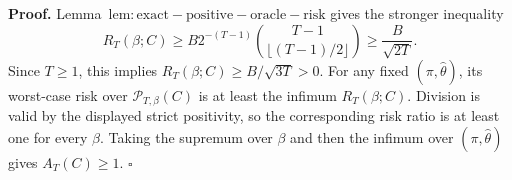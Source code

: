 \textbf{Proof.} Lemma~\(\mathrm{lem:exact-positive-oracle-risk}\) gives the stronger inequality
\[
R_T(\beta;C)\ge B2^{-(T-1)}\binom{T-1}{\lfloor(T-1)/2\rfloor}\ge \frac{B}{\sqrt{2T}}.
\]
Since \(T\ge1\), this implies \(R_T(\beta;C)\ge B/\sqrt{3T}>0\). For any fixed \((\pi,\widehat\theta)\), its worst-case risk over \(\mathcal P_{T,\beta}(C)\) is at least the infimum \(R_T(\beta;C)\). Division is valid by the displayed strict positivity, so the corresponding risk ratio is at least one for every \(\beta\). Taking the supremum over \(\beta\) and then the infimum over \((\pi,\widehat\theta)\) gives \(A_T(C)\ge1\). \(\square\)